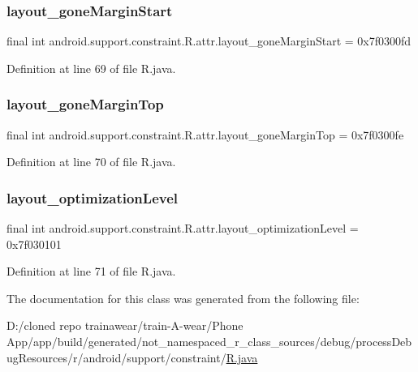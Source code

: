 \subsubsection{\texorpdfstring{layout\_goneMarginStart}{layout\_goneMarginStart}}
{\footnotesize\ttfamily final int android.\+support.\+constraint.\+R.\+attr.\+layout\+\_\+gone\+Margin\+Start = 0x7f0300fd\hspace{0.3cm}{\ttfamily [static]}}



Definition at line 69 of file R.\+java.

\mbox{\label{classandroid_1_1support_1_1constraint_1_1_r_1_1attr_a305701c04de581e4593ac38844061adc}} 
\subsubsection{\texorpdfstring{layout\_goneMarginTop}{layout\_goneMarginTop}}
{\footnotesize\ttfamily final int android.\+support.\+constraint.\+R.\+attr.\+layout\+\_\+gone\+Margin\+Top = 0x7f0300fe\hspace{0.3cm}{\ttfamily [static]}}



Definition at line 70 of file R.\+java.

\mbox{\label{classandroid_1_1support_1_1constraint_1_1_r_1_1attr_a54cee958221f1d1e32255db5fa73d364}} 
\subsubsection{\texorpdfstring{layout\_optimizationLevel}{layout\_optimizationLevel}}
{\footnotesize\ttfamily final int android.\+support.\+constraint.\+R.\+attr.\+layout\+\_\+optimization\+Level = 0x7f030101\hspace{0.3cm}{\ttfamily [static]}}



Definition at line 71 of file R.\+java.



The documentation for this class was generated from the following file\+:\begin{DoxyCompactItemize}
\item 
D\+:/cloned repo trainawear/train-\/\+A-\/wear/\+Phone App/app/build/generated/not\+\_\+namespaced\+\_\+r\+\_\+class\+\_\+sources/debug/process\+Debug\+Resources/r/android/support/constraint/\mbox{\hyperlink{process_debug_resources_2r_2android_2support_2constraint_2_r_8java}{R.\+java}}\end{DoxyCompactItemize}
